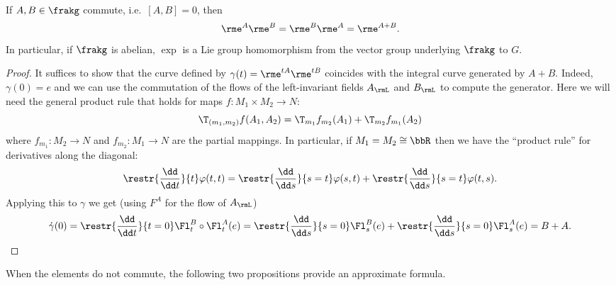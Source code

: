 \begin{prop}\label{prop exp on abelian groups}
    If $A,B\in\frakg$ commute, i.e.~$[A,B]=0$, then
    \[\rme^A\rme^B=\rme^B\rme^A=\rme^{A+B}.\]
    In particular, if $\frakg$ is abelian, $\exp$ is a Lie group homomorphism from the vector group underlying $\frakg$ to $G$.
\end{prop}
\begin{proof}
    It suffices to show that the curve defined by $\gamma(t)=\rme^{tA}\rme^{tB}$ coincides with the integral curve generated by $A+B$. Indeed, $\gamma(0)=e$ and we can use the commutation of the flows of the left-invariant fields $A_\rmL$ and $B_\rmL$ to compute the generator. Here we will need the general product rule that holds for maps $f:M_1\times M_2\to N$:
    \[\T_{(m_1,m_2)}f(A_1,A_2)=\T_{m_1}f_{m_2}(A_1)+\T_{m_2}f_{m_1}(A_2)\]
    where $f_{m_1}:M_2\to N$ and $f_{m_2}:M_1\to N$ are the partial mappings. In particular, if $M_1=M_2\cong \bbR$ then we have the ``product rule'' for derivatives along the diagonal:
    \[\restr{\frac{\dd}{\dd t}}{t}\varphi(t,t)=\restr{\frac{\dd}{\dd s}}{s=t}\varphi(s,t)+\restr{\frac{\dd}{\dd s}}{s=t}\varphi(t,s).\]
    Applying this to $\gamma$ we get (using $F^A$ for the flow of $A_\rmL$)
    \begin{multline}
        \dot\gamma(0)=\restr{\frac{\dd}{\dd t}}{t=0} \Fl^{B}_t\circ \Fl^{A}_t (e)=\restr{\frac{\dd}{\dd s}}{s=0}\Fl^{B}_{s}(e)+\restr{\frac{\dd}{\dd s}}{s=0}\Fl^{A}_{s}(e)=B+A.
    \end{multline}
\end{proof}

When the elements do not commute, the following two propositions provide an approximate formula.

